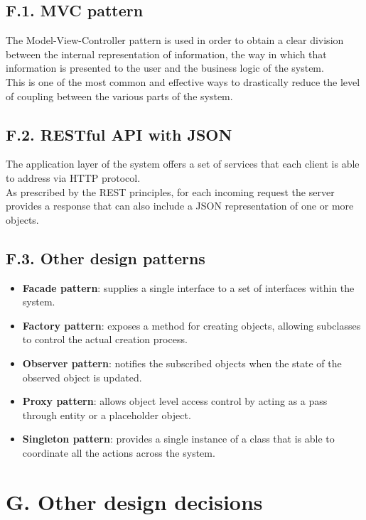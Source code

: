 \subsection{F.1. MVC pattern}

The Model-View-Controller pattern is used in order to obtain a clear division between the internal representation of information, the way in which that information is presented to the user and the business logic of the system.\\
This is one of the most common and effective ways to drastically reduce the level of coupling between the various parts of the system.

\subsection{F.2. RESTful API with JSON}

The application layer of the system offers a set of services that each client is able to address via HTTP protocol.\\
As prescribed by the REST principles, for each incoming request the server provides a response that can also include a JSON representation of one or more objects.

\subsection{F.3. Other design patterns}

\begin{itemize}
    \item \textbf{Facade pattern}: supplies a single interface to a set of interfaces within the system.
    \item \textbf{Factory pattern}: exposes a method for creating objects, allowing subclasses to control the actual creation process.
    \item \textbf{Observer pattern}: notifies the subscribed objects when the state of the observed object is updated.
    \item \textbf{Proxy pattern}: allows object level access control by acting as a pass through entity or a placeholder object.
    \item \textbf{Singleton pattern}: provides a single instance of a class that is able to coordinate all the actions across the system.
\end{itemize}

\section{G. Other design decisions}

